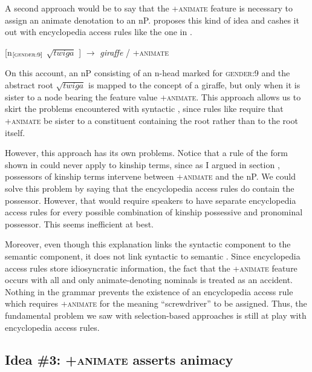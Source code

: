 \documentclass[output=paper,newtxmath,modfonts,nonflat,hidelinks]{langsci/langscibook}
\begin{document}
A second approach would be to say that the +\textsc{animate} feature is necessary to assign an animate denotation to an nP.  \citet{kramer15} proposes this kind of idea and cashes it out with encyclopedia access rules like the one in .

\ea\label{ex:pesetsky:twiga} [n$_{[\textsc{gender}:9]}$ $\sqrt{twiga}$ ] $\rightarrow$ \textit{giraffe} / +\textsc{animate} \z

On this account, an nP consisting of an n-head marked for \textsc{gender}:9 and the abstract root $\sqrt{twiga}$ is mapped to the concept of a giraffe, but only when it is sister to a node bearing the feature value +\textsc{animate}.  This approach allows us to skirt the  problems encountered with syntactic , since rules like  require that +\textsc{animate} be sister to a constituent containing the root rather than to the root itself.

However, this approach has its own  problems.  Notice that a rule of the form shown in  could never apply to kinship terms, since as I argued in section , possessors of kinship terms intervene between +\textsc{animate} and the nP. We could solve this  problem by saying that the encyclopedia access rules do contain the possessor.  However, that would require  speakers to have separate encyclopedia access rules for every possible combination of kinship possessive and pronominal possessor.  This seems inefficient at best.

Moreover, even though this explanation links the syntactic component to the semantic component, it does not link syntactic  to semantic .  Since encyclopedia access rules store idiosyncratic information, the fact that the +\textsc{animate} feature occurs with all and only animate-denoting nominals is treated as an accident. Nothing in the grammar prevents the existence of an encyclopedia access rule which requires +\textsc{animate} for the meaning ``screwdriver'' to be assigned.   Thus, the fundamental problem we saw with selection-based approaches is still at play with encyclopedia access rules. 

\subsection{Idea \#3: +\textsc{animate} asserts animacy} \label{sec:pesetsky:assertanimacy}
\end{document}
